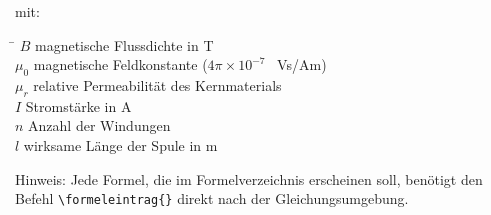mit:
\begin{tabbing}
    \hspace{2cm} \= \kill
    $B$ \> magnetische Flussdichte in T \\
    $\mu_0$ \> magnetische Feldkonstante ($4\pi \times 10^{-7}$ \, Vs/Am) \\
    $\mu_r$ \> relative Permeabilität des Kernmaterials \\
    $I$ \> Stromstärke in A \\
    $n$ \> Anzahl der Windungen \\
    $l$ \> wirksame Länge der Spule in m
\end{tabbing}

Hinweis: Jede Formel, die im Formelverzeichnis erscheinen soll, benötigt den Befehl \texttt{\textbackslash formeleintrag\{\}} direkt nach der Gleichungsumgebung.